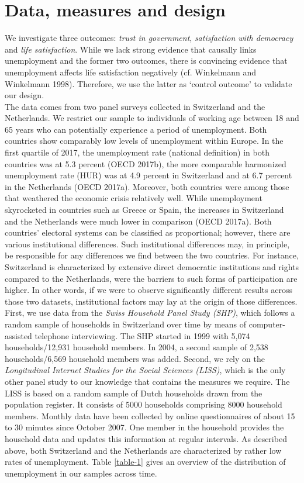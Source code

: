 \documentclass[12pt,]{article}
\begin{document}
\hypertarget{sec:data}{%
\section{Data, measures and design}\label{sec:data}}

We investigate three outcomes: \emph{trust in government}, \emph{satisfaction with democracy} and \emph{life satisfaction}. While we lack strong evidence that causally links unemployment and the former two outcomes, there is convincing evidence that unemployment affects life satisfaction negatively (cf. Winkelmann and Winkelmann 1998). Therefore, we use the latter as `control outcome' to validate our design.\\
The data comes from two panel surveys collected in Switzerland and the Netherlands. We restrict our sample to individuals of working age between 18 and 65 years who can potentially experience a period of unemployment. Both countries show comparably low levels of unemployment within Europe. In the first quartile of 2017, the unemployment rate (national definition) in both countries was at 5.3 percent (OECD 2017b), the more comparable harmonized unemployment rate (HUR) was at 4.9 percent in Switzerland and at 6.7 percent in the Netherlands (OECD 2017a). Moreover, both countries were among those that weathered the economic crisis relatively well. While unemployment skyrocketed in countries such as Greece or Spain, the increases in Switzerland and the Netherlands were much lower in comparison (OECD 2017a). Both countries' electoral systems can be classified as proportional; however, there are various institutional differences. Such institutional differences may, in principle, be responsible for any differences we find between the two countries. For instance, Switzerland is characterized by extensive direct democratic institutions and rights compared to the Netherlands, were the barriers to such forms of participation are higher. In other words, if we were to observe significantly different results across those two datasets, institutional factors may lay at the origin of those differences.\\
First, we use data from the \emph{Swiss Household Panel Study (SHP)}, which follows a random sample of households in Switzerland over time by means of computer-assisted telephone interviewing. The SHP started in 1999 with 5,074 households/12,931 household members. In 2004, a second sample of 2,538 households/6,569 household members was added. Second, we rely on the \emph{Longitudinal Internet Studies for the Social Sciences (LISS)}, which is the only other panel study to our knowledge that contains the measures we require. The LISS is based on a random sample of Dutch households drawn from the population register. It consists of 5000 households comprising 8000 household members. Monthly data have been collected by online questionnaires of about 15 to 30 minutes since October 2007. One member in the household provides the household data and updates this information at regular intervals. As described above, both Switzerland and the Netherlands are characterized by rather low rates of unemployment. Table \ref{table-1} gives an overview of the distribution of unemployment in our samples across time.
\end{document}
